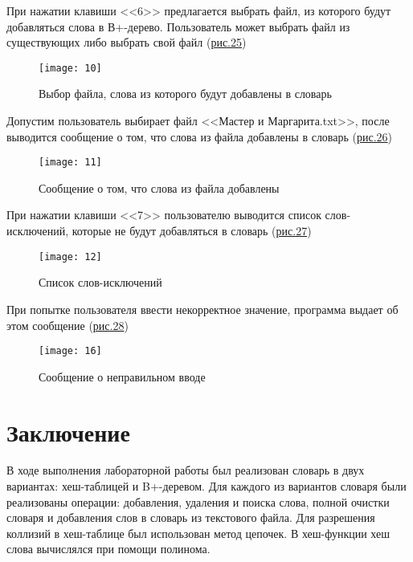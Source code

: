 \documentclass[10pt,a4paper,final]{article} %
\begin{document}
При нажатии клавиши <<6>> предлагается выбрать файл, из которого будут добавляться слова в В+-дерево. Пользователь может выбрать файл из существующих либо выбрать свой файл (\hyperref[fig:20]{рис.25})

\begin{figure}[htbp]
	\centering
	\texttt{[image: 10]}
	\caption{Выбор файла, слова из которого будут добавлены в словарь}
	\label{fig:20}
\end{figure}

\newpage
Допустим пользователь выбирает файл <<Мастер и Маргарита.txt>>, после выводится сообщение о том, что слова из файла добавлены в словарь (\hyperref[fig:21]{рис.26})

\begin{figure}[htbp]
	\centering
	\texttt{[image: 11]}
	\caption{Сообщение о том, что слова из файла добавлены}
	\label{fig:21}
\end{figure}


При нажатии клавиши <<7>> пользователю выводится список слов-исключений, которые не будут добавляться в словарь (\hyperref[fig:22]{рис.27})

\begin{figure}[htbp]
	\centering
	\texttt{[image: 12]}
	\caption{Список слов-исключений}
	\label{fig:22}
\end{figure}

При попытке пользователя ввести некорректное значение, программа выдает об этом сообщение (\hyperref[fig:23]{рис.28})

\begin{figure}[htbp]
	\centering
	\texttt{[image: 16]}
	\caption{Сообщение о неправильном вводе}
	\label{fig:23}
\end{figure}

\newpage
\section*{Заключение}



В ходе выполнения лабораторной работы был реализован словарь в двух вариантах: хеш-таблицей и B+-деревом. Для каждого из вариантов словаря были реализованы операции: добавления, удаления и поиска слова, полной очистки словаря и добавления слов в словарь из текстового файла. Для разрешения коллизий в хеш-таблице был использован метод цепочек. В хеш-функции хеш слова вычислялся при помощи полинома.\\
\end{document}
